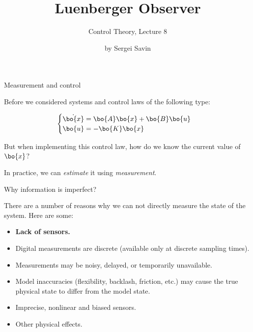 \documentclass{beamer}
\title{Luenberger Observer}
\subtitle{Control Theory, Lecture 8}
\author{by Sergei Savin}
\date{\mydate}
\begin{document}
\maketitle







\begin{frame}{Measurement and control}
\begin{flushleft}

Before we considered systems and control laws of the following type:

\begin{equation}
\begin{cases}
\dot {\bo{x}} = \bo{A} \bo{x} + \bo{B} \bo{u}\\
\bo{u} = -\bo{K} \bo{x}
\end{cases}
\end{equation}

But when implementing this control law, how do we know the current value of $\bo{x}$?

\bigskip

In practice, we can \emph{estimate} it using \emph{measurement}.

\end{flushleft}
\end{frame}

\begin{frame}{Why information is imperfect?}
\begin{flushleft}

There are a number of reasons why we can not directly measure the state of the system. Here are some:

\begin{itemize}
\item \textbf{Lack of sensors.}
\item Digital measurements are discrete (available only at discrete sampling times).
\item Measurements may be noisy, delayed, or temporarily unavailable.
\item Model inaccuracies (flexibility, backlash, friction, etc.) may cause the true physical state to differ from the model state.
\item Imprecise, nonlinear and biased sensors.
\item Other physical effects.
\end{itemize}

\end{flushleft}
\end{frame}
\end{document}
